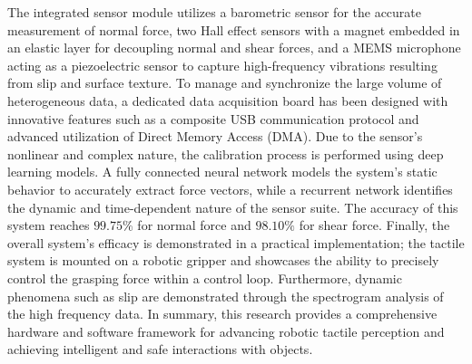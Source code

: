 {The integrated sensor module utilizes a barometric sensor for the accurate measurement of normal force, two Hall effect sensors with a magnet embedded in an elastic layer for decoupling normal and shear forces, and a MEMS microphone acting as a piezoelectric sensor to capture high-frequency vibrations resulting from slip and surface texture. To manage and synchronize the large volume of heterogeneous data, a dedicated data acquisition board has been designed with innovative features such as a composite USB communication protocol and advanced utilization of Direct Memory Access (DMA).
Due to the sensor's nonlinear and complex nature, the calibration process is performed using deep learning models. A fully connected neural network models the system's static behavior to accurately extract force vectors, while a recurrent network identifies the dynamic and time-dependent nature of the sensor suite. The accuracy of this system reaches 
$99.75\%$
 for normal force and 
$98.10\%$ 
 for shear force.
Finally, the overall system's efficacy is demonstrated in a practical implementation; the tactile system is mounted on a robotic gripper and showcases the ability to precisely control the grasping force within a control loop. Furthermore, dynamic phenomena such as slip are demonstrated through the spectrogram analysis of the high frequency data. In summary, this research provides a comprehensive hardware and software framework for advancing robotic tactile perception and achieving intelligent and safe interactions with objects.
}
